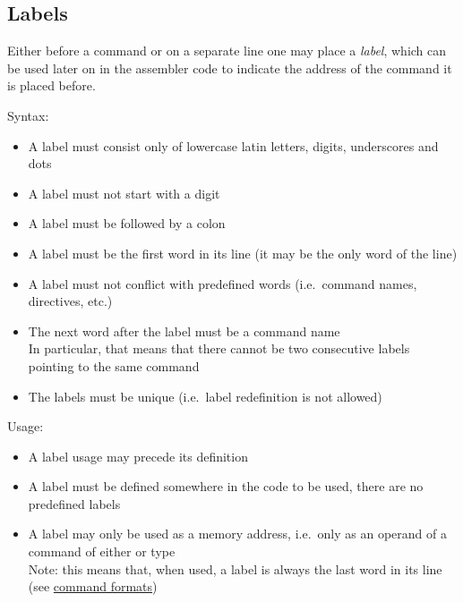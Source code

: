 \subsection{Labels}

Either before a command or on a separate line one may place a \textit{label},
which can be used later on in the assembler code to indicate the address of
the command it is placed before.

Syntax:

\begin{itemize}
    \item A label must consist only of lowercase latin letters, digits, 
    underscores and dots
    
    \item A label must not start with a digit

    \item A label must be followed by a colon

    \item A label must be the first word in its line
    (it may be the only word of the line)

    \item A label must not conflict with predefined words
    (i.e.\ command names, directives, etc.)

    \item The next word after the label must be a command name\\
    In particular, that means that there cannot be two consecutive
    labels pointing to the same command

    \item The labels must be unique (i.e.\ label redefinition is not allowed)
\end{itemize}

Usage:

\begin{itemize}
    \item A label usage may precede its definition

    \item A label must be defined somewhere in the code to be used,
    there are no predefined labels

    \item A label may only be used as a memory address, i.e.\ only as
    an operand of a command of either  or  type \\
    Note: this means that, when used, a label is always the last word in
    its line (see \hyperlink{command:formats}{command formats})
\end{itemize}
